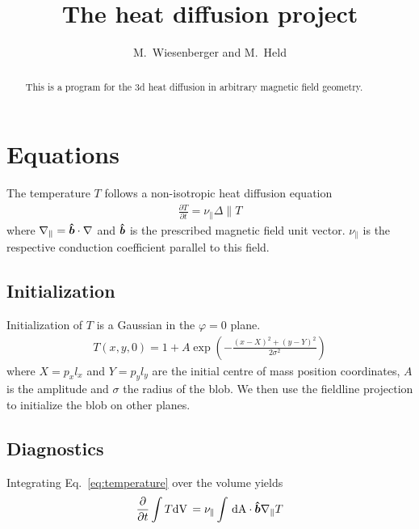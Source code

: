 





\title{The heat diffusion project}
\author{ M.~Wiesenberger and M.~Held}
\maketitle

\begin{abstract}
  This is a program for the 3d heat diffusion in arbitrary magnetic field
  geometry.
  \end{abstract}

\section{Equations}
The temperature $T$ follows a non-isotropic heat diffusion equation
\begin{align}
\frac{\partial T}{\partial t} = \nu_\parallel\Delta\parallel T
\label{eq:temperature}
\end{align}
where $\nabla_\parallel = \bm{\hat{b}} \cdot\nabla$ and
$\bm{\hat{b}}$ is the prescribed magnetic field unit vector.
$\nu_\parallel$ is the respective conduction
coefficient parallel to this field.


\subsection{Initialization}
Initialization of $T$ is a Gaussian in the $\varphi =0$ plane.
\begin{align}
    T(x,y,0) = 1 + A\exp\left( -\frac{(x-X)^2 + (y-Y)^2}{2\sigma^2}\right)
    \label{}
\end{align}
where $X = p_x l_x$ and $Y=p_yl_y$ are the initial centre of mass position coordinates, $A$ is the amplitude and $\sigma$ the
radius of the blob.
We then use the fieldline projection to initialize the blob on other planes.
\subsection{Diagnostics}
Integrating Eq.~\eqref{eq:temperature} over the volume yields
\begin{align}
 \frac{\partial}{\partial t} \int T \mathrm{dV}\, = \nu_\parallel \int \,\mathrm{dA}\cdot \bm{\hat{b}} \nabla_\parallel T
\label{}
\end{align}
